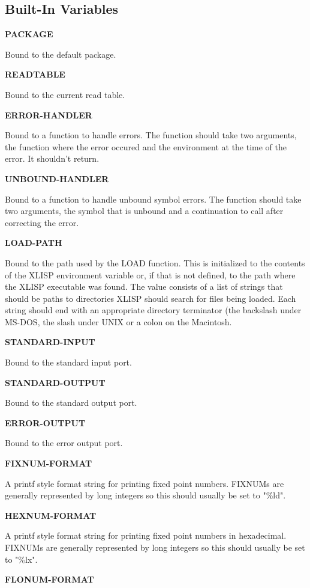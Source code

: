 \documentclass[11pt]{article}
\begin{document}
\subsection{Built-In Variables}
\label{sec-1-4}

\textbf{PACKAGE}

Bound to the default package.

\textbf{READTABLE}

Bound to the current read table.

\textbf{ERROR-HANDLER}

Bound to a function to handle errors.  The function should take two
arguments, the function where the error occured and the environment at
the time of the error.  It shouldn't return.

\textbf{UNBOUND-HANDLER}

Bound to a function to handle unbound symbol errors.  The function
should take two arguments, the symbol that is unbound and a continuation
to call after correcting the error.

\textbf{LOAD-PATH}

Bound to the path used by the LOAD function.  This is initialized to the
contents of the XLISP environment variable or, if that is not defined,
to the path where the XLISP executable was found.  The value consists of
a list of strings that should be paths to directories XLISP should
search for files being loaded.  Each string should end with an
appropriate directory terminator (the backslash under MS-DOS, the slash
under UNIX or a colon on the Macintosh.

\textbf{STANDARD-INPUT}

Bound to the standard input port.

\textbf{STANDARD-OUTPUT}

Bound to the standard output port.

\textbf{ERROR-OUTPUT}

Bound to the error output port.

\textbf{FIXNUM-FORMAT}

A printf style format string for printing fixed point numbers.  FIXNUMs
are generally represented by long integers so this should usually be set
to "\%ld".

\textbf{HEXNUM-FORMAT}

A printf style format string for printing fixed point numbers in
hexadecimal.  FIXNUMs are generally represented by long integers so this
should usually be set to "\%lx".

\textbf{FLONUM-FORMAT}
\end{document}
